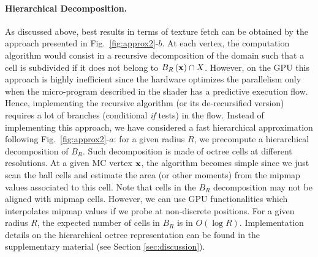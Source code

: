 \documentclass{llncs}
\begin{document}
\paragraph{Hierarchical Decomposition.}  As discussed above, best
results in terms of texture fetch can be obtained by the approach
presented in Fig.~\ref{fig:approx2}-$b$. At each vertex, the
computation algorithm would consist in a recursive decomposition of
the domain such that a cell is subdivided if it does not belong to
$B_{R}\left(\mathbf{x}\right)\cap X$. However, on the GPU %
this approach is
highly inefficient since the hardware optimizes the parallelism only
when the micro-program described in the shader has a predictive
execution flow. Hence, implementing the recursive algorithm (or its
de-recursified version) requires a lot of branches (conditional
\emph{if} tests) in the flow. Instead of implementing this approach,
we have considered a fast hierarchical approximation following
Fig.~\ref{fig:approx2}-$a$: for a given radius $R$, we precompute a
hierarchical decomposition of $B_R$. Such decomposition is made of
octree cells at different resolutions. At a given MC vertex $\mathbf{x}$, the
algorithm becomes simple since we just scan the ball cells and
estimate the area (or other moments) from the mipmap values associated
to this cell. Note that cells in the $B_R$ decomposition may not be
aligned with mipmap cells. However, we can use GPU %
functionalities which interpolates mipmap values if we probe at
non-discrete positions. For a given radius $R$, the expected number of
cells in $B_R$ is in $O(\log{R})$. Implementation details on the
hierarchical octree representation can be found in the supplementary
material (see Section \ref{sec:discussion}).
\end{document}

